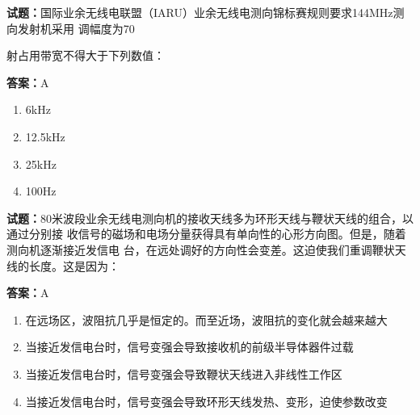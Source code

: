 \documentclass{ctexbook}
\begin{document}




\vspace{1em}

\textbf{试题：}国际业余无线电联盟（IARU）业余无线电测向锦标赛规则要求144MHz测向发射机采用
调幅度为70%


射占用带宽不得大于下列数值： 

\textbf{答案：}A 

\begin{enumerate}[leftmargin=3em]
  \item 6kHz 

  \item 12.5kHz 

  \item 25kHz 

  \item 100Hz 

\end{enumerate}





\vspace{1em}

\textbf{试题：}80米波段业余无线电测向机的接收天线多为环形天线与鞭状天线的组合，以通过分别接
收信号的磁场和电场分量获得具有单向性的心形方向图。但是，随着测向机逐渐接近发信电
台，在远处调好的方向性会变差。这迫使我们重调鞭状天线的长度。这是因为： 

\textbf{答案：}A 

\begin{enumerate}[leftmargin=3em]
  \item 在远场区，波阻抗几乎是恒定的。而至近场，波阻抗的变化就会越来越大 

  \item 当接近发信电台时，信号变强会导致接收机的前级半导体器件过载 

  \item 当接近发信电台时，信号变强会导致鞭状天线进入非线性工作区 

  \item 当接近发信电台时，信号变强会导致环形天线发热、变形，迫使参数改变 

\end{enumerate}


\end{document}
